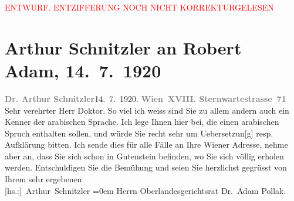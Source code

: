 
\begin{center}
            \textcolor{red}{ENTWURF. ENTZIFFERUNG NOCH NICHT KORREKTURGELESEN}
                      \end{center}
            
               \section[Arthur Schnitzler an Robert Adam, 14. 7. 1920]{ Arthur Schnitzler an Robert Adam, 14. 7. 1920}\nopagebreak{}\rehead{ }\begin{ledgroupsized}[t]{13cm}\normalsize\beginnumbering{} \toendnotes[C]{\smallbreak\pagebreak[2]} 
\toendnotes[C]{\smallbreak}\pstart
           \noindent{}{\pb}\textcolor{gray}{\textbf{Dr. Arthur Schnitzler}}\hfill 14. 7. 1920.\pend
           \pstart
           \textcolor{gray}{\textbf{Wien XVIII. Sternwartestrasse 71}}\pend
           \pstart{}Sehr verehrter Herr Doktor.\pend\pstart
           So viel ich weiss sind Sie zu allem andern auch ein Kenner der arabischen
                    Sprache. Ich lege Ihnen hier \label{K_L02349_1v}\label{K_L02349_1h} bei, die einen arabischen Spruch enthalten sollen, und
                    würde Sie recht sehr um Uebersetzun{[}g{]} resp. Aufklärung
                    bitten. Ich sende dies für alle Fälle an Ihre Wiener Adresse, nehme aber an, dass Sie sich schon in Gutenstein befinden, wo Sie sich völlig erholen
                    werden.\pend
           \pstart
           Entschuldigen Sie die Bemühung und seien Sie herzlichst gegrüsst
                    von{\\[\baselineskip]}Ihrem sehr ergebenen{\\[\baselineskip]}\spacefill\mbox{{[}hs.:{]} Arthur Schnitzler}\pend
           \leftskip=0em{}\pstart
           \noindent{}Herrn Oberlandesgerichtsrat Dr. Adam Pollak.\pend
           \endnumbering{}\end{ledgroupsized}  \newcommand{\dateiname}{L02349}\newcommand{\titel}{Arthur Schnitzler an Robert Adam, 14. 7. 1920}\newcommand{\editorInnen}{Martin Anton Müller und Gerd-Hermann Susen}
      